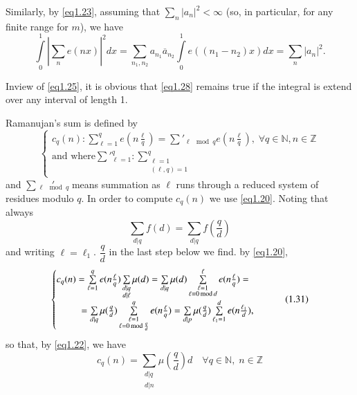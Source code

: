 Similarly, by \eqref{eq1.23}, assuming that $\sum_n
|a_n|^2<\infty$ (so, in particular, for any finite range for $m$), we
have  
\begin{equation*}%
\int\limits^1_0 |\sum\limits_ne(nx)|^2 dx=\sum_{n_1,n_2}
a_{n_1}\overline{a}_{n_2} \int\limits^1_0
e((n_1-n_2)x)dx=\sum_n|a_n|^2. \tag{1.28}\label{eq1.28} 
\end{equation*}

In\pageoriginale view of \eqref{eq1.25}, it is obvious that
\eqref{eq1.28} remains 
true if the integral is extend over any interval of length 1.
  
Ramanujan's sum is defined by 
\begin{equation*}%
\begin{cases}
c_q(n):\sum\limits^q_{\ell=1} e(n\frac{\ell}{q}) = \sum\limits'_{\ell
  \mod q} e(n \frac{\ell}{q}), \; \forall q\in \mathbb{N}, n\in
\mathbb{Z}\\ 
\text{and where
}\sum\limits'^{q}_{\ell=1}:\sum\limits^{q}_{\substack{\ell=1\\(\ell, q)=1}}
\end{cases}\tag{1.29}\label{eq1.29}
\end{equation*} 
and $\sum'\limits_{\ell \mod q}$ means summation as $\ell$ runs through
a reduced system of residues modulo $q$. In order to compute $c_q(n)$
we use \eqref{eq1.20}. Noting that always  
\begin{equation*}%
\sum_{d|q}f(d)=\sum_{d|q} f (\frac{q}{d}) \tag{1.30}\label{eq1.30}
\end{equation*}
and writing $\ell=\ell_1$. $\dfrac{q}{d}$ in the last step below we
find. by \eqref{eq1.20}, 
\begin{equation*}%
\begin{cases}
c_q(n)=  \sum\limits^{q}_{\ell = 1} e(n \frac{\ell}{q})
\sum\limits_{\substack{{d|q}\\d|\ell}} \mu (d) = \sum\limits_{d|q} \mu (d)
\sum\limits^{\ell}_{\substack{\ell =1 \\ \ell \equiv 0 \mod d}}
e(n\frac{\ell}{q})  =\\ 
\hspace{0.9cm}=\sum\limits_{d|q}\mu (\frac{q}{d}
)\sum\limits^q_{\substack{\ell=1\\ \ell=0 \mod \frac{q} {d}}} e(n
\frac{\ell}{q})= \sum\limits_{d|p}\mu (\frac{q}{d})
\sum\limits_{\ell_1=1}^{d}e(n\frac{\ell_1}{d}),  
\end{cases}\tag{1.31}\label{eq1.31}
\end{equation*}
so that, by \eqref{eq1.22}, we have 
\begin{equation*}%
c_q(n)= \sum_{\substack{d|q\\d|n}}\mu (\frac{q}{d})d  \quad  \forall
q\in \mathbb{N}, \;  n\in \mathbb{Z} \tag{1.32}\label{eq1.32} 
\end{equation*}

